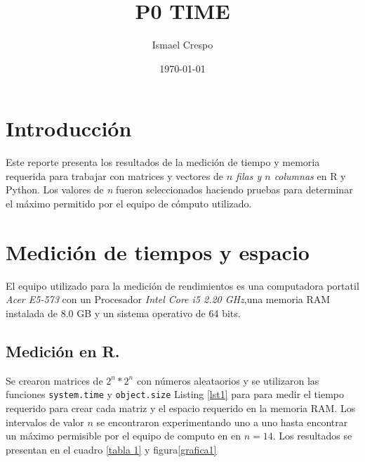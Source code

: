 \documentclass{article}
\title{P0 TIME}
\author{Ismael Crespo}
\date{\today}
\begin{document}
\maketitle

\section{Introducción}
Este reporte presenta los resultados de la medición de tiempo y memoria requerida para trabajar con matrices y vectores de \emph{$n$ filas y $n$ columnas} en R y Python. Los valores de \emph{n} fueron seleccionados haciendo pruebas para determinar el máximo permitido por el equipo de cómputo utilizado. 

\section{Medición de tiempos y espacio }
El equipo utilizado para la medición de rendimientos es una computadora portatil \emph{Acer E5-573 } con un Procesador \emph{Intel Core i5 2.20 GHz},una memoria RAM instalada de 8.0 GB y un sistema operativo de 64 bits.
\subsection{Medición en R.} 
Se crearon matrices de $2^n * 2^n$ con números aleataorios y se utilizaron las funciones \texttt{system.time} y \texttt{object.size} Listing \ref{lst1} para para medir el tiempo requerido para crear cada matriz y el espacio requerido en la memoria RAM. Los intervalos de valor $n$ se encontraron experimentando uno a uno hasta encontrar un máximo permisible por el equipo de computo en en $n=14$. Los resultados se presentan en el cuadro \ref{tabla 1} y figura\ref{grafica1}
\end{document}
